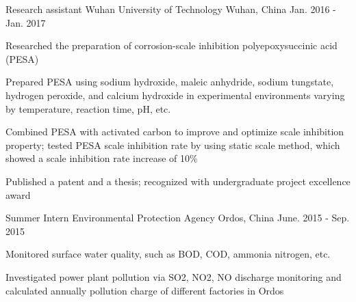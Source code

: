 \begin{cventries}
  \cventry
    {Research assistant} %
    {Wuhan University of Technology} %
    {Wuhan, China} %
    {Jan. 2016 - Jan. 2017} %
    {
       \begin{cvitems} %
        \item {Researched the preparation of corrosion-scale inhibition polyepoxysuccinic acid (PESA)}
        \item {Prepared PESA using sodium hydroxide, maleic anhydride, sodium tungstate, hydrogen peroxide, and calcium hydroxide in experimental environments varying by temperature, reaction time, pH, etc.}
        \item {Combined PESA with activated carbon to improve and optimize scale inhibition property; tested PESA scale inhibition rate by using static scale method, which showed a scale inhibition rate increase of 10\%}
        \item {Published a patent and a thesis; recognized with undergraduate project excellence award}
        \end{cvitems}
    }

  \cventry
    {Summer Intern} %
    {Environmental Protection Agency} %
    {Ordos, China} %
    {June. 2015 - Sep. 2015} %
    {
      \begin{cvitems} %
        \item {Monitored surface water quality, such as BOD, COD, ammonia nitrogen, etc.}
        \item {Investigated power plant pollution via SO2, NO2, NO discharge monitoring and calculated annually pollution charge of different factories in Ordos}
      \end{cvitems}
    }

\end{cventries}
